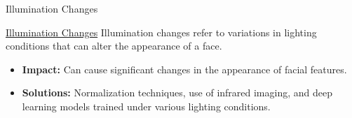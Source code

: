 \documentclass[pdfpagelabels=false, usepdftitle=false, aspectratio=169]{beamer}
\begin{document}
\begin{frame}{Illumination Changes}
\scriptsize
\begin{block}{\href{https://arxiv.org/abs/2004.02980}{Illumination Changes}}
    Illumination changes refer to variations in lighting conditions that can alter the appearance of a face.
\end{block}
\begin{itemize}
    \item \textbf{Impact:} Can cause significant changes in the appearance of facial features.
    \item \textbf{Solutions:} Normalization techniques, use of infrared imaging, and deep learning models trained under various lighting conditions.
\end{itemize}
\end{frame}
\end{document}
